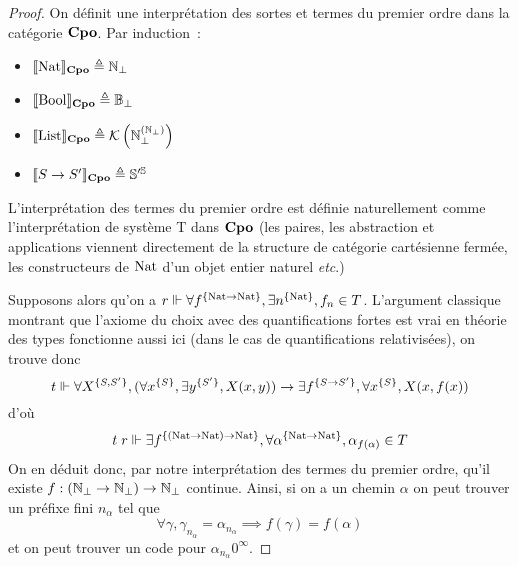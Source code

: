 \documentclass{article}
\begin{document}
\begin{proof}
  On définit une interprétation des sortes et termes du premier ordre dans la catégorie $\mathbf{Cpo}$. Par induction~:
  \begin{itemize}
  \item $\llbracket \mathrm{Nat} \rrbracket_{\mathbf{Cpo}} \triangleq \mathbb{N}_\bot$
  \item $\llbracket \mathrm{Bool} \rrbracket_{\mathbf{Cpo}} \triangleq \mathbb{B}_\bot$
  \item $\llbracket \mathrm{List} \rrbracket_{\mathbf{Cpo}} \triangleq \mathcal K\left(\mathbb{N}_\bot^{(\mathbb{N}_\bot)}\right)$
  \item $\llbracket S \to S' \rrbracket_{\mathbf{Cpo}} \triangleq \mathbb{S}'^{\mathbb{S}}$
  \end{itemize}
  L'interprétation des termes du premier ordre est définie naturellement comme l'interprétation de système T dans $\mathbf{Cpo}$ (les paires, les abstraction et applications viennent directement de la structure de catégorie cartésienne fermée, les constructeurs de $\mathrm{Nat}$ d'un objet entier naturel \textit{etc}.)

  Supposons alors qu'on a $r\Vdash \forall f^{\{\mathrm{Nat} \to \mathrm{Nat}\}}, \exists n^{\{\mathrm{Nat}\}}, f_n \in T$. L'argument classique montrant que l'axiome du choix avec des quantifications fortes est vrai en théorie des types fonctionne aussi ici (dans le cas de quantifications relativisées), on trouve donc
  \[t\Vdash \forall X^{\{S,S'\}}, (\forall x^{\{S\}}, \exists y^{\{S'\}}, X(x,y))\to \exists f^{\{S \to S'\}}, \forall x^{\{S\}}, X(x,f(x))\]
  d'où
  \[t\;r\Vdash \exists f^{\{(\mathrm{Nat}\to\mathrm{Nat})\to\mathrm{Nat}\}}, \forall \alpha^{\{\mathrm{Nat}\to\mathrm{Nat}\}}, \alpha_{f(\alpha)}\in T\]
  On en déduit donc, par notre interprétation des termes du premier ordre, qu'il existe $f : (\mathbb{N}_\bot\to\mathbb{N}_\bot)\to\mathbb{N}_\bot$ continue. Ainsi, si on a un chemin $\alpha$ on peut trouver un préfixe fini $n_\alpha$ tel que
  \[\forall \gamma, \gamma_{n_\alpha} = \alpha_{n_\alpha} \implies f(\gamma) = f(\alpha)\]
  et on peut trouver un code pour $\alpha_{n_\alpha} 0^\infty$.
\end{proof}
\end{document}
